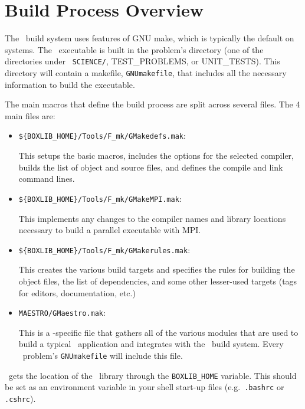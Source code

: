 \label{ch:make}

\section{Build Process Overview}

The \maestro\ build system uses features of GNU make, which is
typically the default on systems.  The \maestro\ executable is built
in the problem's directory (one of the directories under {\tt
SCIENCE/}, {TEST\_PROBLEMS}, or {UNIT\_TESTS}).  This directory will
contain a makefile, {\tt GNUmakefile}, that includes all the necessary
information to build the executable.  

The main macros that define the build process are split across several
files.  The 4 main files are:
\begin{itemize}
\item {\tt \$\{BOXLIB\_HOME\}/Tools/F\_mk/GMakedefs.mak}:

  This setups the basic macros, includes the options for the selected
  compiler, builds the list of object and source files, and defines
  the compile and link command lines.

\item {\tt \$\{BOXLIB\_HOME\}/Tools/F\_mk/GMakeMPI.mak}:

  This implements any changes to the compiler names and library
  locations necessary to build a parallel executable with MPI.

\item {\tt \$\{BOXLIB\_HOME\}/Tools/F\_mk/GMakerules.mak}:

  This creates the various build targets and specifies the rules for
  building the object files, the list of dependencies, and some other
  lesser-used targets (tags for editors, documentation, etc.)

\item {\tt MAESTRO/GMaestro.mak}:

  This is a \maestro-specific file that gathers all of the various
  modules that are used to build a typical \maestro\ application
  and integrates with the \boxlib\ build system.  Every \maestro\
  problem's {\tt GNUmakefile} will include this file.

\end{itemize}

\maestro\ gets the location of the \boxlib\ library through the 
{\tt BOXLIB\_HOME} variable.  This should be set as an environment
variable in your shell start-up files (e.g.\ {\tt .bashrc} or {\tt
.cshrc}).

